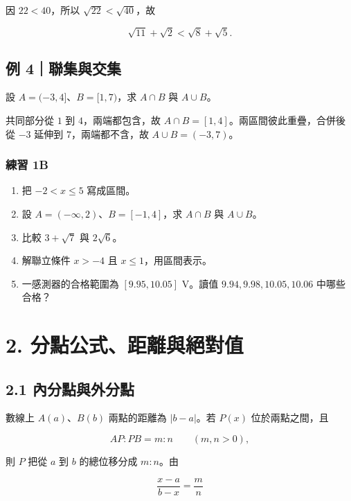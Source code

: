 \documentclass[11pt,a4paper]{article}
\providecommand{\tightlist}{%
  \setlength{\itemsep}{0pt}\setlength{\parskip}{0pt}}
\begin{document}
因 \(22<40\)，所以 \(\sqrt{22}<\sqrt{40}\)，故

\[
\boxed{\sqrt{11}+\sqrt2<\sqrt8+\sqrt5}.
\]

\subsection{例 4｜聯集與交集}\label{ux4f8b-4ux806fux96c6ux8207ux4ea4ux96c6}

設 \(A=(-3,4]\)、\(B=[1,7)\)，求 \(A\cap B\) 與 \(A\cup B\)。

共同部分從 \(1\) 到 \(4\)，兩端都包含，故 \(A\cap B=[1,4]\)。兩區間彼此重疊，合併後從 \(-3\) 延伸到 \(7\)，兩端都不含，故 \(A\cup B=(-3,7)\)。

\subsubsection{練習 1B}\label{ux7df4ux7fd2-1b}

\begin{enumerate}
\def\labelenumi{\arabic{enumi}.}
\tightlist
\item
  把 \(-2<x\le5\) 寫成區間。
\item
  設 \(A=(-\infty,2)\)、\(B=[-1,4]\)，求 \(A\cap B\) 與 \(A\cup B\)。
\item
  比較 \(3+\sqrt7\) 與 \(2\sqrt6\)。
\item
  解聯立條件 \(x>-4\) 且 \(x\le1\)，用區間表示。
\item
  一感測器的合格範圍為 \([9.95,10.05]\) V。讀值 \(9.94,9.98,10.05,10.06\) 中哪些合格？
\end{enumerate}

\section{2. 分點公式、距離與絕對值}\label{ux5206ux9edeux516cux5f0fux8dddux96e2ux8207ux7d55ux5c0dux503c}

\subsection{2.1 內分點與外分點}\label{ux5167ux5206ux9edeux8207ux5916ux5206ux9ede}

數線上 \(A(a)\)、\(B(b)\) 兩點的距離為 \(|b-a|\)。若 \(P(x)\) 位於兩點之間，且

\[
AP:PB=m:n\qquad(m,n>0),
\]

則 \(P\) 把從 \(a\) 到 \(b\) 的總位移分成 \(m:n\)。由

\[
\frac{x-a}{b-x}=\frac mn
\]
\end{document}
